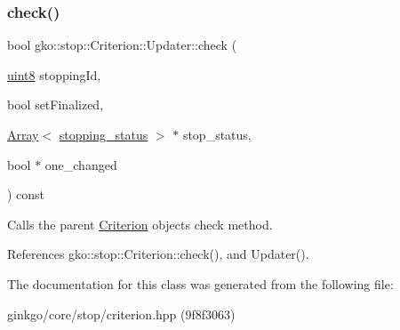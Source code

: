 \subsubsection{\texorpdfstring{check()}{check()}}
{\footnotesize\ttfamily bool gko\+::stop\+::\+Criterion\+::\+Updater\+::check (\begin{DoxyParamCaption}\item[{\hyperlink{namespacegko_a3950fc3732811a8563484e5098c31531}{uint8}}]{stopping\+Id,  }\item[{bool}]{set\+Finalized,  }\item[{\hyperlink{classgko_1_1Array}{Array}$<$ \hyperlink{classgko_1_1stopping__status}{stopping\+\_\+status} $>$ $\ast$}]{stop\+\_\+status,  }\item[{bool $\ast$}]{one\+\_\+changed }\end{DoxyParamCaption}) const}



Calls the parent \hyperlink{classgko_1_1stop_1_1Criterion}{Criterion} object\textquotesingle{}s check method. 



References gko\+::stop\+::\+Criterion\+::check(), and Updater().



The documentation for this class was generated from the following file\+:\begin{DoxyCompactItemize}
\item 
ginkgo/core/stop/criterion.\+hpp (9f8f3063)\end{DoxyCompactItemize}
